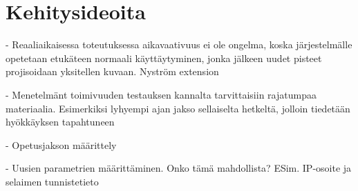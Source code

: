 \section{Kehitysideoita}

- Reaaliaikaisessa toteutuksessa aikavaativuus ei ole ongelma, koska järjestelmälle opetetaan etukäteen normaali käyttäytyminen, jonka jälkeen
uudet pisteet projisoidaan yksitellen kuvaan. Nyström extension

- Menetelmänt toimivuuden testauksen kannalta tarvittaisiin rajatumpaa materiaalia. Esimerkiksi lyhyempi ajan jakso sellaiselta hetkeltä, jolloin
 tiedetään hyökkäyksen tapahtuneen

- Opetusjakson määrittely

- Uusien parametrien määrittäminen. Onko tämä mahdollista? ESim. IP-osoite ja selaimen tunnistetieto
